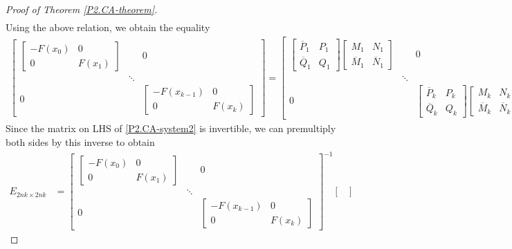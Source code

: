 \documentclass[10pt,reqno,oneside,a4paper]{article}
\begin{document}
\begin{proof}[Proof of Theorem \ref{P2.CA-theorem}]
\begin{align*}
\end{align*}
Using the above relation, we obtain the equality
\begin{align}\label{P2.CA-system2}
\begin{bmatrix}
\begin{bmatrix}
-F(x_0) & 0 \\
0 & F(x_1) 
\end{bmatrix} & & 0 \\
& \ddots & \\
0 & & \begin{bmatrix}
-F(x_{k-1}) & 0 \\
0 & F(x_k) 
\end{bmatrix}
\end{bmatrix} =
\begin{bmatrix}
\begin{bmatrix}
\overline{P}_1 & P_1 \\
\overline{Q}_1 & Q_1 
\end{bmatrix} 
\begin{bmatrix}
M_1 & N_1  \\
\overline{M}_1 & \overline{N}_1 
\end{bmatrix} & & 0 \\
 & \ddots & \\
0 & & \begin{bmatrix}
\overline{P}_k & P_k \\
\overline{Q}_k & Q_k 
\end{bmatrix} 
\begin{bmatrix}
M_k & N_k  \\
\overline{M}_k & \overline{N}_k 
\end{bmatrix}
\end{bmatrix}.
\end{align}
Since the matrix on LHS of \eqref{P2.CA-system2} is invertible, we can premultiply both sides by this inverse to obtain
\begin{align}
E_{2nk\times 2nk}
&= 
\begin{bmatrix}
\begin{bmatrix}
-F(x_0) & 0 \\
0 & F(x_1) 
\end{bmatrix} & & 0 \\
& \ddots & \\
0 & & \begin{bmatrix}
-F(x_{k-1}) & 0 \\
0 & F(x_k) 
\end{bmatrix}
\end{bmatrix}^{-1}
\begin{bmatrix}

\end{bmatrix}
\end{align}
\end{proof}
\end{document}
